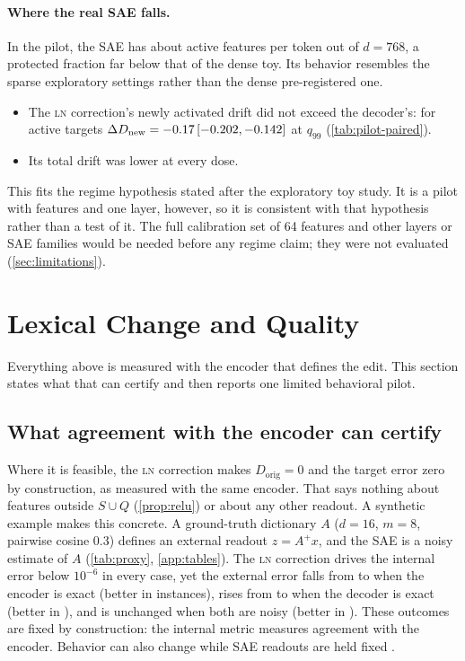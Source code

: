 \documentclass{article}
\theoremstyle{plain}
\theoremstyle{definition}
\theoremstyle{remark}
\newcommand{\LN}{\textsc{ln}}
\begin{document}
\paragraph{Where the real SAE falls.}
In the pilot, the SAE has about \CxLZero{} active features per token out of $d=768$, a
protected fraction far below that of the dense toy. Its behavior resembles the sparse
exploratory settings rather than the dense pre-registered one.
\begin{itemize}
  \item The \LN{} correction's newly activated drift did not exceed the decoder's: for
  active targets $\Delta D_{\mathrm{new}} = -0.17\,\allowbreak[-0.202, -0.142]$ at $q_{99}$
  (\cref{tab:pilot-paired}).
  \item Its total drift was lower at every dose.
\end{itemize}
This fits the regime hypothesis stated after the exploratory toy study. It is a pilot with
\PilotFeatures{} features and one layer, however, so it is consistent with that hypothesis
rather than a test of it. The full calibration set of 64 features and other layers or SAE
families would be needed before any regime claim; they were not evaluated
(\cref{sec:limitations}).

\section{Lexical Change and Quality}
\label{sec:external}

Everything above is measured with the encoder that defines the edit. This section states
what that can certify and then reports one limited behavioral pilot.

\subsection{What agreement with the encoder can certify}
\label{sec:certify}
Where it is feasible, the \LN{} correction makes $D_{\mathrm{orig}} = 0$ and the target error
zero by construction, as measured with the same encoder. That says nothing about features
outside $S\cup Q$ (\cref{prop:relu}) or about any other readout. A synthetic example makes
this concrete. A ground-truth dictionary $A$ ($d=16$, $m=8$, pairwise cosine 0.3) defines an
external readout $z = A^{+}x$, and the SAE is a noisy estimate of $A$
(\cref{tab:proxy}, \cref{app:tables}). The \LN{} correction drives the internal error below
$10^{-6}$ in every case, yet the external error falls from \TxEncAccDecExt{} to
\TxEncAccLnExt{} when the encoder is exact (better in \TxEncAccWins{} instances), rises from
\TxDecAccDecExt{} to \TxDecAccLnExt{} when the decoder is exact (better in \TxDecAccWins),
and is unchanged when both are noisy (better in \TxBothWins). These outcomes are fixed by
construction: the internal metric measures agreement with the encoder. Behavior can also
change while SAE readouts are held fixed \citep{cui2026sae}.
\end{document}
